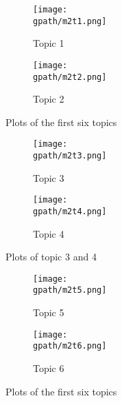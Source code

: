 \documentclass[12 pt,twopage]{article}
\begin{document}
\begin{figure}
 \begin{subfigure}[c]{1\textwidth}
  \caption{Topic 1}
  \centering
  \texttt{[image: \\gpath/m2t1.png]}
 \end{subfigure}
 \begin{subfigure}[c]{1\textwidth}
  \caption{Topic 2}
  \centering
  \texttt{[image: \\gpath/m2t2.png]}
 \end{subfigure}
 \caption{Plots of the first six topics}
 \label{fig:m2t12}
\end{figure}


\begin{figure}
 \begin{subfigure}[c]{1\textwidth}
  \caption{Topic 3}
  \centering
  \texttt{[image: \\gpath/m2t3.png]}
 \end{subfigure}
 \begin{subfigure}[c]{1\textwidth}
  \caption{Topic 4}
  \centering
  \texttt{[image: \\gpath/m2t4.png]}
 \end{subfigure}
 \caption{Plots of topic 3 and 4}
 \label{fig:m2t34}
\end{figure}


\begin{figure}
 \begin{subfigure}[c]{1\textwidth}
  \caption{Topic 5}
  \centering
  \texttt{[image: \\gpath/m2t5.png]}
 \end{subfigure}
 \begin{subfigure}[c]{1\textwidth}
  \caption{Topic 6}
  \centering
  \texttt{[image: \\gpath/m2t6.png]}
 \end{subfigure}
 \caption{Plots of the first six topics}
 \label{fig:m2t56}
\end{figure}
\end{document}
